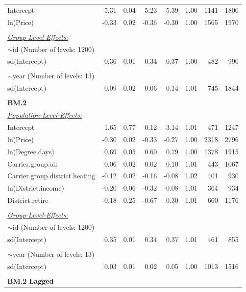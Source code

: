 \documentclass[12pt,twoside]{reedthesis}
\begin{document}
\begin{longtable}[c]{lrrrrrrr}
Intercept & 5.31 & 0.04 & 5.23 & 5.39 & 1.00 & 1141 & 1800 \\
ln(Price) & -0.33 & 0.02 & -0.36 & -0.30 & 1.00 & 1565 & 1970 \\
 &  &  &  &  &  &  &  \\
{\ul \textit{Group-Level-Effects:}} &  &  &  &  &  &  &  \\
$\sim$id (Number of levels: 1200) &  &  &  &  &  &  &  \\
sd(Intercept) & 0.36 & 0.01 & 0.34 & 0.37 & 1.00 & 482 & 990 \\
 &  &  &  &  &  &  &  \\
$\sim$year (Number of levels: 13) &  &  &  &  &  &  &  \\
sd(Intercept) & 0.09 & 0.02 & 0.06 & 0.14 & 1.01 & 745 & 1844 \\ \hline
 &  &  &  &  &  &  &  \\ \hline
\textbf{BM.2} &  &  &  &  &  &  &  \\
{\ul \textit{Population-Level-Effects:}} &  &  &  &  &  &  &  \\
Intercept & 1.65 & 0.77 & 0.12 & 3.14 & 1.01 & 471 & 1247 \\
ln(Price) & -0.30 & 0.02 & -0.33 & -0.27 & 1.00 & 2318 & 2796 \\
ln(Degree.days) & 0.69 & 0.05 & 0.60 & 0.79 & 1.00 & 1378 & 1915 \\
Carrier.group.oil & 0.06 & 0.02 & 0.02 & 0.10 & 1.01 & 443 & 1067 \\
Carrier.group.district.heating & -0.12 & 0.02 & -0.16 & -0.08 & 1.02 & 401 & 930 \\
ln(District.income) & -0.20 & 0.06 & -0.32 & -0.08 & 1.01 & 364 & 934 \\
District.retire & -0.18 & 0.25 & -0.67 & 0.30 & 1.01 & 660 & 1176 \\
 &  &  &  &  &  &  &  \\
{\ul \textit{Group-Level-Effects:}} &  &  &  &  &  &  &  \\
$\sim$id (Number of levels: 1200) &  &  &  &  &  &  &  \\
sd(Intercept) & 0.35 & 0.01 & 0.34 & 0.37 & 1.01 & 461 & 855 \\
 &  &  &  &  &  &  &  \\
$\sim$year (Number of levels: 13) &  &  &  &  &  &  &  \\
sd(Intercept) & 0.03 & 0.01 & 0.02 & 0.05 & 1.00 & 1013 & 1516 \\ \hline
 &  &  &  &  &  &  &  \\ \hline
\textbf{BM.2 Lagged} &  &  &  &  &  &  &  \\

\end{longtable}
\end{document}
